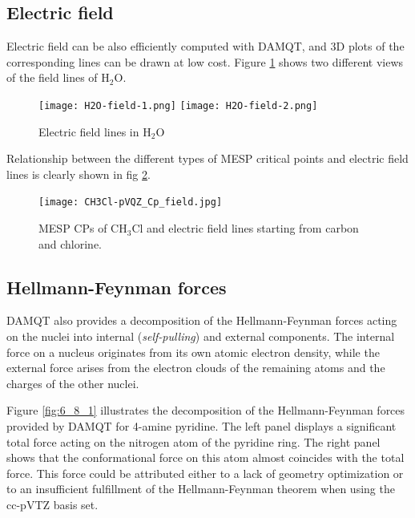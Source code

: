 \documentclass[10pt]{article}
\begin{document}
\subsection{Electric field \label{sec:6.7} }

Electric field can be also efficiently computed with DAMQT, and 3D plots of
the corresponding lines can be drawn at low cost. Figure \ref{fig:6_7_1} shows
two different views of the field lines of H$_2$O. 

\begin{figure}[H]
\begin{center}
\hspace*{-2mm}
\texttt{[image: H2O-field-1.png]}
\hspace*{5mm}
\texttt{[image: H2O-field-2.png]}
\end{center}
\caption{ Electric field lines in H$_2$O
\label{fig:6_7_1}}
\end{figure}

Relationship between the different types of MESP critical points and electric field lines is clearly shown in 
fig \ref{fig:6_7_2}.

\begin{figure}[H]
\begin{center}
\texttt{[image: CH3Cl-pVQZ\_Cp\_field.jpg]}
\end{center}
\caption[MESP CPs and electric field of CH$_3$Cl]{ MESP CPs of CH$_3$Cl and electric field lines starting from carbon and chlorine.
\label{fig:6_7_2}}
\end{figure}

\subsection{Hellmann-Feynman forces \label{sec:6.8} }

DAMQT also provides a decomposition of the Hellmann-Feynman forces acting on the
nuclei into internal 
({\it self-pulling}) and 
external components. The internal force on a nucleus 
originates from its own atomic electron density, while the external force arises from 
the electron clouds of the remaining atoms and the charges of the other nuclei.

Figure \ref{fig:6_8_1} illustrates the decomposition of the Hellmann-Feynman forces 
provided by DAMQT for 4-amine pyridine. The left panel displays a significant total 
force acting on the nitrogen atom of the pyridine ring. The right panel shows that 
the conformational force on this atom almost coincides with the total force. 
This force could be attributed either to a lack of geometry optimization or to an 
insufficient fulfillment of the Hellmann-Feynman theorem when using the cc-pVTZ 
basis set.
\end{document}
